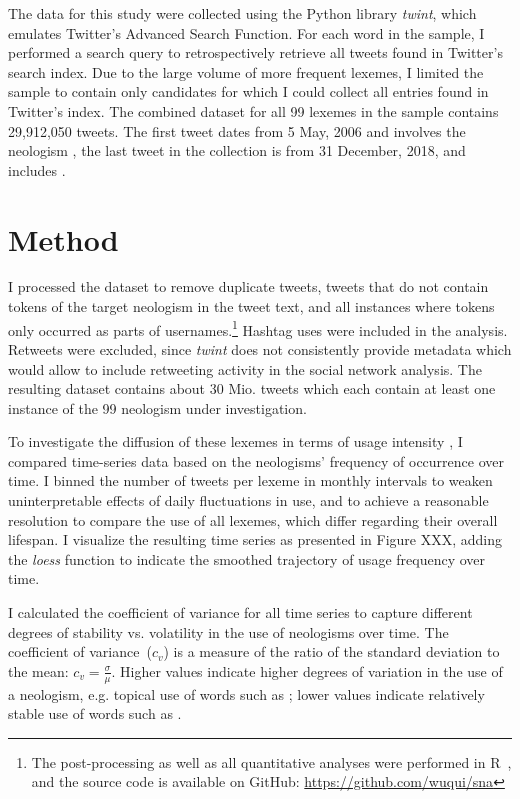 \documentclass[
  a4paper,
  abstract=on,
  captions=tableabove
  ]{scrartcl}
\begin{document}
    The data for this study were collected using the Python library \emph{twint}, which emulates Twitter's Advanced Search Function. For each word in the sample, I performed a search query to retrospectively retrieve all tweets found in Twitter's search index. Due to the large volume of more frequent lexemes, I limited the sample to contain only candidates for which I could collect all entries found in Twitter's index. The combined dataset for all 99 lexemes in the sample contains 29,912,050 tweets. The first tweet dates from 5 May, 2006 and involves the neologism , the last tweet in the collection is from 31 December, 2018, and includes .

\section{Method}
  \label{sec:method}

  I processed the dataset to remove duplicate tweets, tweets that do not contain tokens of the target neologism in the tweet text, and all instances where tokens only occurred as parts of usernames.\footnote{The post-processing as well as all quantitative analyses were performed in R~\parencite{RCoreTeam2018LanguageEnvironment}, and the source code is available on GitHub: \url{https://github.com/wuqui/sna}} Hashtag uses were included in the analysis. Retweets were excluded, since \emph{twint} does not consistently provide metadata which would allow to include retweeting activity in the social network analysis. The resulting dataset contains about 30 Mio. tweets which each contain at least one instance of the 99 neologism under investigation.

  To investigate the diffusion of these lexemes in terms of usage intensity \parencite{Stefanowitsch2017CorpusbasedPerspective}, I compared time-series data based on the neologisms' frequency of occurrence over time. I binned the number of tweets per lexeme in monthly intervals to weaken uninterpretable effects of daily fluctuations in use, and to achieve a reasonable resolution to compare the use of all lexemes, which differ regarding their overall lifespan. I visualize the resulting time series as presented in Figure XXX, adding the \emph{loess} function to indicate the smoothed trajectory of usage frequency over time.

  I calculated the coefficient of variance for all time series to capture different degrees of stability vs. volatility in the use of neologisms over time. The coefficient of variance~($c_{v}$) is a measure of the ratio of the standard deviation to the mean: $c_{v} = \frac{\sigma}{\mu}$. Higher values indicate higher degrees of variation in the use of a neologism, e.g. topical use of words such as ; lower values indicate relatively stable use of words such as .
\end{document}

